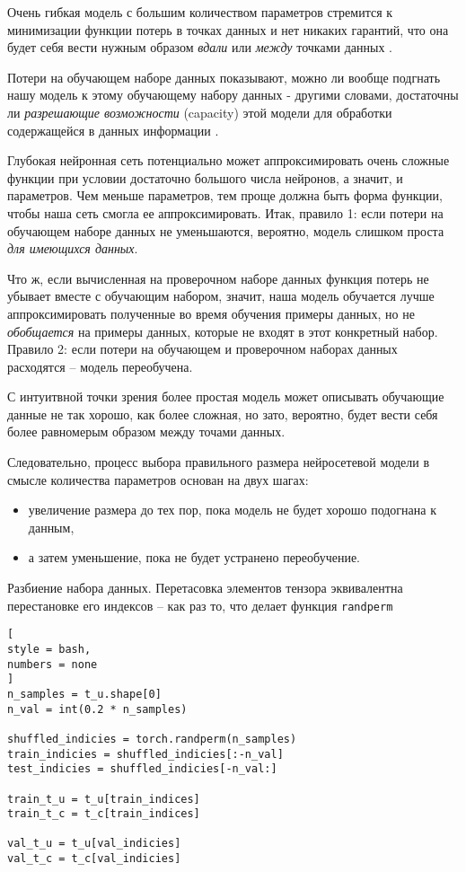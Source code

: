 \documentclass[%
	11pt,
	a4paper,
	utf8,
		]{article}
\begin{document}
Очень гибкая модель с большим количеством параметров стремится к минимизации функции потерь в точках данных и нет никаких гарантий, что она будет себя вести нужным образом \emph{вдали} или \emph{между} точками данных \cite[]{pytorch-2022}.

Потери на обучающем наборе данных показывают, можно ли вообще подгнать нашу модель к этому обучающему набору данных - другими словами, достаточны ли \emph{разрешающие возможности} (capacity) этой модели для обработки содержащейся в данных информации \cite[]{pytorch-2022}.

Глубокая нейронная сеть потенциально может аппроксимировать очень сложные функции при условии достаточно большого числа нейронов, а значит, и параметров. Чем меньше параметров, тем проще должна быть форма функции, чтобы наша сеть смогла ее аппроксимировать. Итак, правило 1: если потери на обучающем наборе данных не уменьшаются, вероятно, модель слишком проста \emph{для имеющихся данных}.

Что ж, если вычисленная на проверочном наборе данных функция потерь не убывает вместе с обучающим набором, значит, наша модель обучается лучше аппроксимировать полученные во время обучения примеры данных, но не \emph{обобщается} на примеры данных, которые не входят в этот конкретный набор. Правило 2: если потери на обучающем и проверочном наборах данных расходятся -- модель переобучена.

С интуитвной точки зрения более простая модель может описывать обучающие данные не так хорошо, как более сложная, но зато, вероятно, будет вести себя более равномерым образом между точами данных.

Следовательно, процесс выбора правильного размера нейросетевой модели в смысле количества параметров основан на двух шагах:
\begin{itemize}
	\item увеличение размера до тех пор, пока модель не будет хорошо подогнана к данным,
	
	\item а затем уменьшение, пока не будет устранено переобучение.
\end{itemize}

Разбиение набора данных. Перетасовка элементов тензора эквивалентна перестановке его индексов -- как раз то, что делает функция \verb|randperm|
\begin{lstlisting}[
style = bash,
numbers = none
]
n_samples = t_u.shape[0]
n_val = int(0.2 * n_samples)

shuffled_indicies = torch.randperm(n_samples)
train_indicies = shuffled_indicies[:-n_val]
test_indicies = shuffled_indicies[-n_val:]

train_t_u = t_u[train_indices]
train_t_c = t_c[train_indices]

val_t_u = t_u[val_indicies]
val_t_c = t_c[val_indicies]
\end{lstlisting}
\end{document}
